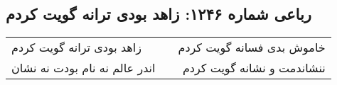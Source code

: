 \begin{center}
\section*{رباعی شماره ۱۲۴۶: زاهد بودی ترانه گویت کردم}
\label{sec:1246}
\begin{longtable}{l p{0.5cm} r}
زاهد بودی ترانه گویت کردم
&&
خاموش بدی فسانه گویت کردم
\\
اندر عالم نه نام بودت نه نشان
&&
ننشاندمت و نشانه گویت کردم
\\
\end{longtable}
\end{center}
